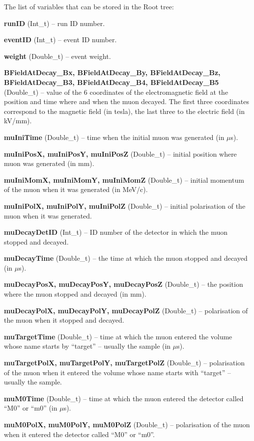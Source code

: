 \documentclass[twoside]{dis04}
\begin{document}
The list of variables that can be stored in the Root tree:
\begin{description}
\item{\bf runID} (Int\_t) -- run ID number.        
\item{\bf eventID} (Int\_t) -- event ID number.
\item{\bf weight} (Double\_t) -- event weight.
\item{\bf BFieldAtDecay\_Bx, BFieldAtDecay\_By, BFieldAtDecay\_Bz, BFieldAtDecay\_B3, BFieldAtDecay\_B4, BFieldAtDecay\_B5} (Double\_t) --
	value of the 6 coordinates of the electromagnetic field at the position and time where and when the muon decayed.
        The first three coordinates correspond to the magnetic field (in tesla), the last three to the electric field
	(in kV/mm).
\item{\bf muIniTime} (Double\_t) -- time when the initial muon was generated (in $\mu$s).
\item{\bf muIniPosX, muIniPosY, muIniPosZ}  (Double\_t) -- initial position where muon was generated (in mm).
\item{\bf muIniMomX, muIniMomY, muIniMomZ}  (Double\_t) -- initial momentum of the muon when it was generated (in MeV/c).
\item{\bf muIniPolX, muIniPolY, muIniPolZ}  (Double\_t) -- initial polarisation of the muon when it was generated.
\item{\bf muDecayDetID} (Int\_t) -- ID number of the detector in which the muon stopped and decayed.
\item{\bf muDecayTime} (Double\_t) -- the time at which the muon stopped and decayed (in $\mu$s).
\item{\bf muDecayPosX, muDecayPosY, muDecayPosZ}  (Double\_t) -- the position where the muon stopped and decayed (in mm).
\item{\bf muDecayPolX, muDecayPolY, muDecayPolZ}  (Double\_t) -- polarisation of the muon when it stopped and decayed.
\item{\bf muTargetTime}  (Double\_t) -- time at which the muon entered the volume whose name starts by ``target'' -- usually the sample (in $\mu$s).
\item{\bf muTargetPolX, muTargetPolY, muTargetPolZ} (Double\_t) -- polarisation of the muon when it entered the volume whose name starts with ``target'' -- usually the sample.
\item{\bf muM0Time}  (Double\_t) -- time at which the muon entered the detector called ``M0'' or ``m0'' (in $\mu$s).
\item{\bf muM0PolX, muM0PolY, muM0PolZ}  (Double\_t) -- polarisation of the muon when it entered the detector called ``M0'' or ``m0''.

\end{description}
\end{document}

